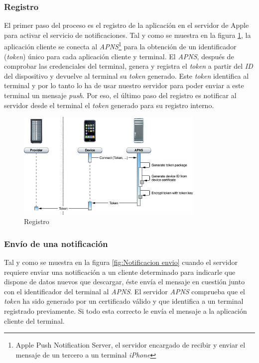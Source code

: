    \subsubsection*{Registro}

     El primer paso del proceso es el registro de la aplicación en el servidor de Apple para activar el servicio de notificaciones. Tal y como se muestra en la figura \ref{fig:Notificacion Registro}, la aplicación cliente se conecta al \emph{APNS}\footnote{Apple Push Notification Server, el servidor encargado de recibir y enviar el mensaje de un tercero a un terminal \emph{iPhone}} para la obtención de un identificador (\emph{token}) único para cada aplicación cliente y terminal. El \emph{APNS}, después de comprobar las credenciales del terminal, genera y registra el \emph{token} a partir del \emph{ID} del dispositivo y devuelve al terminal su \emph{token} generado. Este \emph{token} identifica al terminal y por lo tanto lo ha de usar nuestro servidor para poder enviar a este terminal un mensaje \emph{push}. Por eso, el último paso del registro es notificar al servidor desde el terminal el \emph{token} generado para su registro interno.
     
 \begin{figure}[h!]
    \centering
       \includegraphics[width=0.8\textwidth]{./images/token_generation.jpg}
     \caption{Registro }
   \label{fig:Notificacion Registro}
\end{figure}
  
     \subsubsection*{Envío de una notificación}
     
     Tal y como se muestra en la figura \ref{fig:Notificacion envio} cuando el servidor requiere enviar una notificación a un cliente determinado para indicarle que dispone de datos nuevos que descargar, éste envía el mensaje en cuestión junto con el identificador del terminal al \emph{APNS}. El servidor \emph{APNS} comprueba que el \emph{token} ha sido generado por un certificado válido y que identifica a un terminal registrado previamente. Si todo esta correcto le envía el mensaje a la aplicación cliente del terminal.
     
